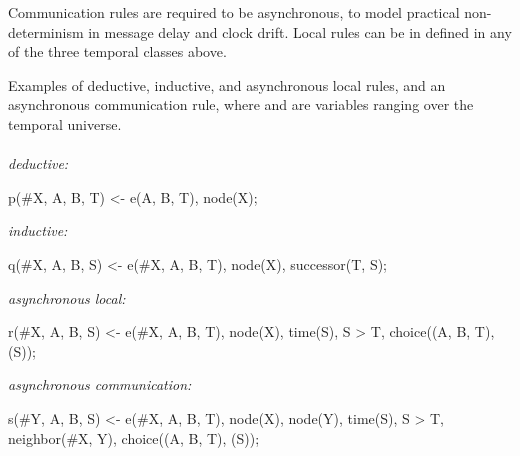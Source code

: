 Communication rules are required to be asynchronous, to model practical non-determinism in message delay and clock drift.  Local rules can be in defined in any of the three temporal classes above.

\begin{example}
\label{ex:nonsugared}
Examples of deductive, inductive, and asynchronous local rules, and an asynchronous communication rule, where  and  are variables ranging over the temporal universe.
\\\\
\textit{deductive:}\\
\begin{Dedalus}
p(#X, A, B, T) <- e(A, B, T), node(X);
\end{Dedalus}
\textit{inductive:}\\
\begin{Dedalus}
q(#X, A, B, S) <- e(#X, A, B, T), node(X),
                  successor(T, S);
\end{Dedalus}
\textit{asynchronous local:}\\
\begin{Dedalus}
r(#X, A, B, S) <- e(#X, A, B, T), node(X), time(S),
                  S > T, choice((A, B, T), (S));
\end{Dedalus}
\textit{asynchronous communication:}\\
\begin{Dedalus}
s(#Y, A, B, S) <- e(#X, A, B, T), node(X), node(Y),
                  time(S), S > T, neighbor(#X, Y),
                  choice((A, B, T), (S));
\end{Dedalus}
\end{example}

